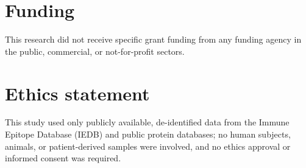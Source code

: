 \section*{Funding}

This research did not receive specific grant funding from any funding agency in the public, commercial, or not-for-profit sectors.

\section*{Ethics statement}
This study used only publicly available, de-identified data from the Immune Epitope Database (IEDB) and public protein databases; no human subjects, animals, or patient-derived samples were involved, and no ethics approval or informed consent was required.
